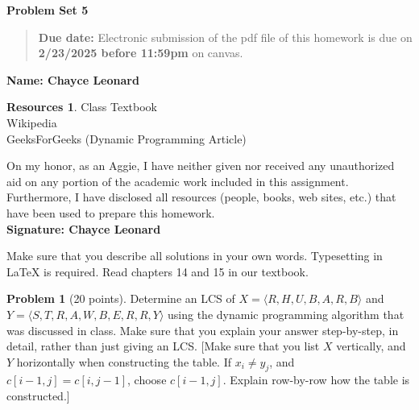 \documentclass{article}
\theoremstyle{definition}
\newtheorem{problem}{Problem}
\newtheorem*{resources}{Resources}
\newcommand{\name}[1]{\noindent\textbf{Name: #1}}
\newcommand{\honor}{\noindent On my honor, as an Aggie, I have neither
  given nor received any unauthorized aid on any portion of the
  academic work included in this assignment. Furthermore, I have
  disclosed all resources (people, books, web sites, etc.) that have
  been used to prepare this homework. \\[1ex]
 \textbf{Signature: Chayce Leonard} \underline{\hspace*{5cm}} }
\newcommand{\problemset}[1]{\begin{center}\textbf{Problem Set
      #1}\end{center}}
\newcommand{\duedate}[1]{\begin{quote}\textbf{Due date:} Electronic
    submission of the pdf file of this homework is due on
    \textbf{#1} on canvas. \end{quote} }
\begin{document}
\problemset{5}
\duedate{2/23/2025 before 11:59pm}
\name{ Chayce Leonard}
\begin{resources}
Class Textbook \\
Wikipedia \\
GeeksForGeeks (Dynamic Programming Article)


\end{resources}
\honor

\newpage
Make sure that you describe all solutions in your own
words. Typesetting in \LaTeX{} is required. Read
chapters 14 and 15 in our textbook. 

\begin{problem}[20 points]
Determine an LCS of $X = \langle R,H,U,B,A,R,B\rangle$ and
  $Y = \langle S,T,R,A,W,B,E,R,R,Y \rangle$ using the dynamic programming
  algorithm that was discussed in class.  Make sure that you explain your
  answer step-by-step, in detail, rather than just giving an LCS.
  [Make sure that you list $X$ vertically, and $Y$ horizontally when
  constructing the table. If $x_i\neq y_j$, and $c[i-1,j] = c[i,j-1]$,
  choose $c[i-1,j]$. Explain row-by-row how the table is constructed.] 
\end{problem}
\end{document}
